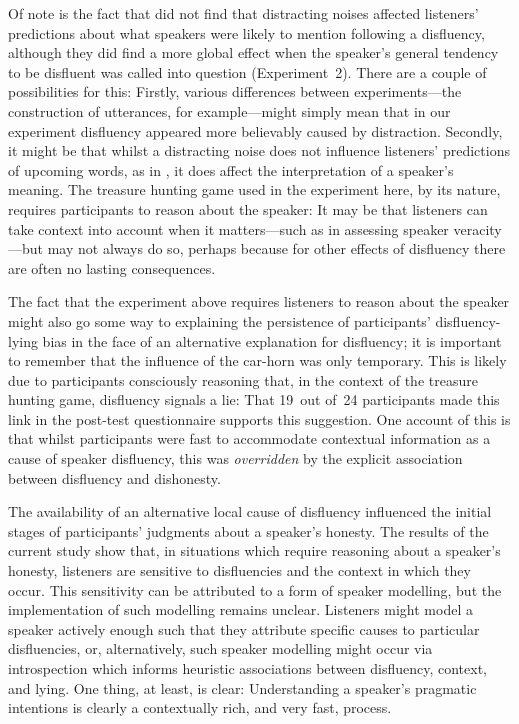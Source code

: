 \documentclass[a4paper,man,natbib]{apa6}
\newcommand*{\term}[1]{\emph{#1}} %
\begin{document}
Of note is the fact that \citet[][Experiment~3]{Arnold2007} did not find that distracting noises affected listeners' predictions about what speakers were likely to mention following a disfluency, although they did find a more global effect when the speaker's general tendency to be disfluent was called into question (Experiment~2).
There are a couple of possibilities for this:
Firstly, various differences between experiments---the construction of utterances, for example---might simply mean that in our experiment disfluency appeared more believably caused by distraction.
Secondly, it might be that whilst a distracting noise does not influence listeners' predictions of upcoming words, as in \citet{Arnold2007}, it does affect the interpretation of a speaker's meaning.
The treasure hunting game used in the experiment here, by its nature, requires participants to reason about the speaker:
It may be that listeners can take context into account when it matters---such as in assessing speaker veracity---but may not always do so, perhaps because for other effects of disfluency there are often no lasting consequences.

The fact that the experiment above requires listeners to reason about the speaker might also go some way to explaining the persistence of participants' disfluency-lying bias in the face of an alternative explanation for disfluency; it is important to remember that the influence of the car-horn was only temporary. 
This is likely due to participants consciously reasoning that, in the context of the treasure hunting game, disfluency signals a lie: 
That 19~out of~24 participants made this link in the post-test questionnaire supports this suggestion.
One account of this is that whilst participants were fast to accommodate contextual information as a cause of speaker disfluency, this was \term{overridden} by the explicit association between disfluency and dishonesty.

The availability of an alternative local cause of disfluency influenced the initial stages of participants' judgments about a speaker's honesty. 
The results of the current study show that, in situations which require reasoning about a speaker's honesty, listeners are sensitive to disfluencies and the context in which they occur.
This sensitivity can be attributed to a form of speaker modelling, but the implementation of such modelling remains unclear.
Listeners might model a speaker actively enough such that they attribute specific causes to particular disfluencies, or, alternatively, such speaker modelling might occur via introspection which informs heuristic associations between disfluency, context, and lying. 
One thing, at least, is clear: Understanding a speaker's pragmatic intentions is clearly a contextually rich, and very fast, process. 




\end{document}
